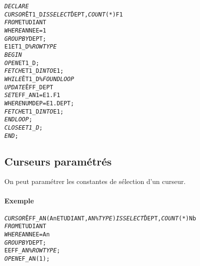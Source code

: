 \documentclass[10pt]{article}
\begin{document}
				\begin{alltt}
					\begin{tabbing}
						\emph{DECLARE}\=\\
							\>\emph{CURSOR} \= ET1_D \emph{IS} \=\emph{SELECT} \=DEPT, \emph{COUNT}(*) F1\\
									\>\>\emph{FROM}\>ETUDIANT\\
									\>\>\emph{WHERE}\>ANNEE=1\\
									\>\>\emph{GROUP BY} DEPT;\\
							\>E1\>ET1_D\%\emph{ROWTYPE}\\
						\emph{BEGIN}\\
							\>\emph{OPEN} ET1_D;\\
							\>\emph{FETCH} ET1_D \emph{INTO} E1;\\
							\>\emph{WHILE} \= ET1_D\%\emph{FOUND LOOP}\\
								\>\>\emph{UPDATE} \=EFF_DEPT\\
								\>\>\>\emph{SET}\>EFF_AN1=E1.F1\\
								\>\>\>\emph{WHERE}\>NUMDEP=E1.DEPT;\\
								\>\>\emph{FETCH} ET1_D \emph{INTO} E1;\\
							\>\emph{END LOOP};
							\>\emph{CLOSE ET1_D};
						\emph{END};
					\end{tabbing}
				\end{alltt}

		\subsection{Curseurs paramétrés}
			On peut paramétrer les constantes de sélection d'un curseur.
			
			\paragraph{Exemple}
				\begin{alltt}
					\begin{tabbing}
						\emph{CURSOR} \=EFF_AN(An ETUDIANT, AN\%\emph{TYPE}) \emph{IS} \=\emph{SELECT} \=DEPT, \emph{COUNT}(*) Nb\\
									\>\emph{FROM}\>ETUDIANT\\
									\>\emph{WHERE}\>ANNEE=An\\
									\>\emph{GROUP BY} DEPT;\\
						E \>EFF_AN\%\emph{ROWTYPE};\\
						\emph{OPEN} \>EF_AN(1);
					\end{tabbing}
				\end{alltt}
				
\end{document}
